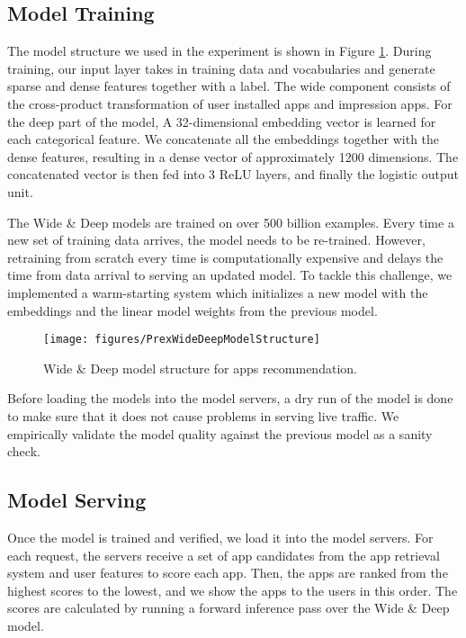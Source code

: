 \documentclass{sig-alternate-05-2015}
\begin{document}
\subsection{Model Training}

The model structure we used in the experiment is shown in Figure \ref{fig:PrexWideDeepModelStructure}. During training, our input layer takes in training data and vocabularies and generate sparse and dense features together with a label. The wide component consists of the cross-product transformation of user installed apps and impression apps. For the deep part of the model, A 32-dimensional embedding vector is learned for each categorical feature. We concatenate all the embeddings together with the dense features, resulting in a dense vector of approximately 1200 dimensions. The concatenated vector is then fed into 3 ReLU layers, and finally the logistic output unit.

The Wide \& Deep models are trained on over 500 billion examples. Every time a new set of training data arrives, the model needs to be re-trained. However, retraining from scratch every time is computationally expensive and delays the time from data arrival to serving an updated model. To tackle this challenge, we implemented a warm-starting system which initializes a new model with the embeddings and the linear model weights from the previous model.

\begin{figure}[t!]
	\centering
	\texttt{[image: figures/PrexWideDeepModelStructure]}
	\caption{Wide \& Deep model structure for apps recommendation.}
	\label{fig:PrexWideDeepModelStructure}
\end{figure}

Before loading the models into the model servers, a dry run of the model is done to make sure that it does not cause problems in serving live traffic. We empirically validate the model quality against the previous model as a sanity check.

\subsection{Model Serving}
Once the model is trained and verified, we load it into the model servers. For each request, the servers receive a set of app candidates from the app retrieval system and user features to score each app. Then, the apps are ranked from the highest scores to the lowest, and we show the apps to the users in this order. The scores are calculated by running a forward inference pass over the Wide \& Deep model.
\end{document}
